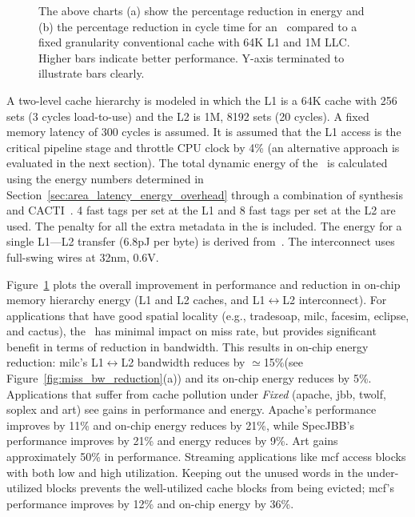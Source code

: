 {{\begin{figure}[!h]
    \caption{ The above charts (a) show the percentage reduction in energy and (b) the percentage reduction in cycle time for an \AC\ compared to a fixed granularity conventional cache with 64K L1 and 1M LLC. Higher bars indicate better performance. Y-axis terminated to illustrate bars clearly.}
    \label{plot:multi_sys_perf_energy}
\end{figure}

\clearpage

A two-level cache hierarchy is modeled in which the L1 is a 64K cache with 256 sets (3 cycles load-to-use) and the L2 is 1M, 8192 sets (20 cycles). A fixed memory latency of 300 cycles is assumed. It is assumed that the L1 access is the critical pipeline stage and throttle CPU clock by 4\% (an alternative approach is evaluated in the next section).  The total dynamic energy of the \AC\ is calculated using the energy numbers determined in Section~\ref{sec:area_latency_energy_overhead} through a combination of synthesis and CACTI~\cite{Muralimanohar:2007:ONO:1331699.1331704}. 4 fast tags per set at the L1 and 8 fast tags per set at the L2 are used. The penalty for all the extra metadata in the \AC{} is included. The energy for a single L1---L2 transfer (6.8pJ per byte) is derived from~\cite{weti,Muralimanohar:2007:ONO:1331699.1331704}. The interconnect uses full-swing wires at 32nm, 0.6V. 

Figure~\ref{plot:multi_sys_perf_energy} plots the overall improvement in performance and reduction in on-chip memory hierarchy energy (L1 and L2 caches, and L1$\leftrightarrow$L2 interconnect). For applications that have good spatial locality (e.g., tradesoap, milc, facesim, eclipse, and cactus), the \AC\ has minimal impact on miss rate, but provides significant benefit in terms of reduction in bandwidth. This results in on-chip energy reduction: milc's L1$\leftrightarrow$L2 bandwidth reduces by $\simeq$15\%(see Figure~\ref{fig:miss_bw_reduction}(a)) and its on-chip energy reduces by 5\%. Applications that suffer from cache pollution under \textit{Fixed} (apache, jbb, twolf, soplex and art) see gains in performance and energy. Apache's performance improves by 11\% and on-chip energy reduces by 21\%, while SpecJBB's performance improves by 21\% and energy reduces by 9\%. Art gains approximately 50\% in performance.  Streaming applications like mcf access blocks with both low and high utilization. Keeping out the unused words in the under-utilized blocks prevents the well-utilized cache blocks from being evicted; mcf's performance improves by 12\% and on-chip energy by 36\%.

}}
